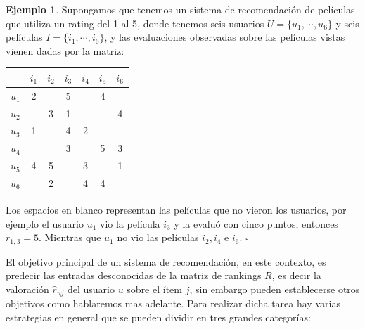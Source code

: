\documentclass[hidelinks,12pt,a4paper]{book}
\theoremstyle{plain}
\theoremstyle{definition}
\newtheorem{ejemplo}{{\textbf{Ejemplo}}}[chapter]
\begin{document}
\begin{ejemplo}
Supongamos que tenemos un sistema de recomendación de películas que utiliza un rating del 1 al 5, donde tenemos seis usuarios $U=\{u_1,\cdots, u_6\}$ y seis películas $I=\{i_1,\cdots, i_6\}$, y las evaluaciones observadas sobre las películas vistas vienen dadas por la matriz:

\begin{table}[htb]
\begin{center}
\begin{tabular}{|c|c|c|c|c|c|c|}
\hline
  & $i_1$ & $i_2$ & $i_3$ & $i_4$ & $i_5$ & $i_6$ \\
\hline
$u_1$  & 2 &  & 5 &  & 4 &  \\
\hline
$u_2$  &  & 3 & 1 &  &  & 4 \\
\hline
$u_3$  & 1 &  & 4 & 2 &  &  \\
\hline
$u_4$  &  &  & 3 &  & 5 & 3 \\
\hline
$u_5$  & 4 & 5 &  & 3 &  & 1 \\
\hline
$u_6$  &  & 2 &  & 4 & 4 &  \\
\hline
\end{tabular}
\end{center}
\end{table}
Los espacios en blanco representan las películas que no vieron los usuarios, por ejemplo el usuario $u_1$ vio la película $i_3$ y la evaluó con cinco puntos, entonces $r_{1,3} = 5$. Mientras que $u_1$ no vio las películas $i_2,i_4$ e $i_6$. \hfill$\square$
\end{ejemplo}


El objetivo principal de un sistema de recomendación, en este contexto, es predecir las entradas desconocidas de la matriz de rankings $R$, es decir la valoración $\hat{r}_{uj}$ del usuario $u$ sobre el ítem $j$, sin embargo pueden establecerse otros objetivos como hablaremos mas adelante. Para realizar dicha tarea hay varias estrategias en general que se pueden dividir en tres grandes categorías\cite{agg}:
\end{document}
